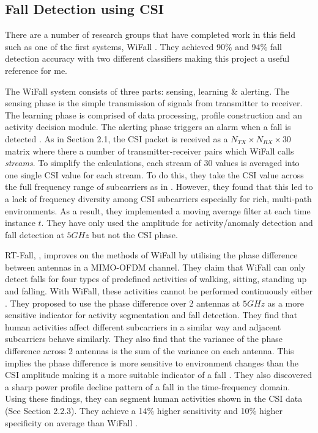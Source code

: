 \subsection{Fall Detection using CSI}
There are a number of research groups that have completed work in this field such as one of the first systems, WiFall \citep{WiFall}. They achieved 90\% and 94\% fall detection accuracy with two different classifiers making this project a useful reference for me. \par
The WiFall system consists of three parts: sensing, learning \& alerting. The sensing phase is the simple transmission of signals from transmitter to receiver. The learning phase is comprised of data processing, profile construction and an activity decision module. The alerting phase triggers an alarm when a fall is detected \citep{WiFall}. As in Section 2.1, the CSI packet is received as a $N_{TX}\times N_{RX}\times 30$ matrix where there a number of transmitter-receiver pairs which WiFall calls \textit{streams}. To simplify the calculations, each stream of 30 values is averaged into one single CSI value for each stream. To do this, they take the CSI value across the full frequency range of subcarriers as in \cite{FilaIndoor}. However, they found that this led to a lack of frequency diversity among CSI subcarriers especially for rich, multi-path environments. As a result, they implemented a moving average filter at each time instance $t$. They have only used the amplitude for activity/anomaly detection and fall detection at $5GHz$ but not the CSI phase. \par
RT-Fall, \cite{RTFall}, improves on the methods of WiFall by utilising the phase difference between antennas in a MIMO-OFDM channel. They claim that WiFall can only detect falls for four types of predefined activities of walking, sitting, standing up and falling. With WiFall, these activities cannot be performed continuously either \citep{RTFall}. They proposed to use the phase difference over 2 antennas at $5GHz$ as a more sensitive indicator for activity segmentation and fall detection. They find that human activities affect different subcarriers in a similar way and adjacent subcarriers behave similarly. They also find that the variance of the phase difference across 2 antennas is the sum of the variance on each antenna. This implies the phase difference is more sensitive to environment changes than the CSI amplitude making it a more suitable indicator of a fall \citep{PhaseU}. They also discovered a sharp power profile decline pattern of a fall in the time-frequency domain. Using these findings, they can segment human activities shown in the CSI data (See Section 2.2.3). They achieve a 14\% higher sensitivity and 10\% higher specificity on average than WiFall \citep{RTFall}.

